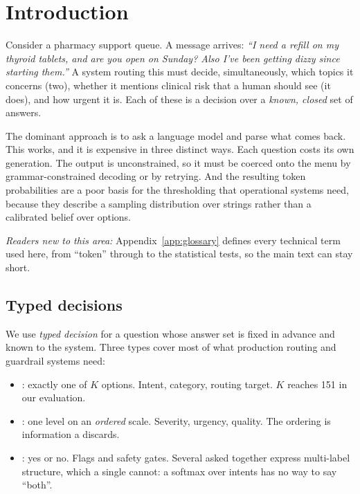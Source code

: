 \section{Introduction}
\label{sec:intro}

Consider a pharmacy support queue. A message arrives: \emph{``I need a
refill on my thyroid tablets, and are you open on Sunday? Also I've been
getting dizzy since starting them.''} A system routing this must decide,
simultaneously, which topics it concerns (two), whether it mentions
clinical risk that a human should see (it does), and how urgent it is.
Each of these is a decision over a \emph{known, closed} set of answers.

The dominant approach is to ask a language model and parse what comes back.
This works, and it is expensive in three distinct ways. Each question costs
its own generation. The output is unconstrained, so it must be coerced onto
the menu by grammar-constrained decoding or by retrying. And the resulting
token probabilities are a poor basis for the thresholding that operational
systems need, because they describe a sampling distribution over strings
rather than a calibrated belief over options.

\emph{Readers new to this area:} Appendix~\ref{app:glossary} defines every
technical term used here, from ``token'' through to the statistical tests,
so the main text can stay short.

\subsection{Typed decisions}

We use \emph{typed decision} for a question whose answer set is fixed in
advance and known to the system. Three types cover most of what production
routing and guardrail systems need:

\begin{itemize}[leftmargin=1.4em,itemsep=0.25em]
  \item \choice{}: exactly one of $K$ options. Intent, category, routing
    target. $K$ reaches 151 in our evaluation.
  \item \score{}: one level on an \emph{ordered} scale. Severity,
    urgency, quality. The ordering is information a \choice{} discards.
  \item \noul{}: yes or no. Flags and safety gates. Several asked
    together express multi-label structure, which a single \choice{}
    cannot: a softmax over intents has no way to say ``both''.
\end{itemize}

